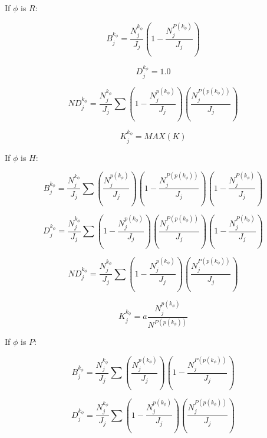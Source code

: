 If $\phi$ is $R$:

\begin{equation}
B^{k_{\phi}}_{j} = \frac{N^{k_{\phi}}_{j}}{J_{j}} (1-\frac{N^{P(k_{\phi})}_{j}}{J_{j}})
\end{equation}

\begin{equation}
D^{k_{\phi}}_{j} = 1.0 
\end{equation}

\begin{equation}
ND^{k_{\phi}}_{j} = \frac{N^{k_{\phi}}_{j}}{J_{j}} \sum (1-\frac{N^{p(k_{\phi})}_{j}}{J_{j}}) (\frac{N^{P(p(k_{\phi}))}_{j}}{J_{j}})
\end{equation}

\begin{equation}
K^{k_{\phi}}_{j} = MAX(K)
\end{equation}

If $\phi$ is $H$: 

\begin{equation}
B^{k_{\phi}}_{j} = \frac{N^{k_{\phi}}_{j}}{J_{j}} \sum (\frac{N^{p(k_{\phi})}_{j}}{J_{j}}) (1-\frac{N^{P(p(k_{\phi}))}_{j}}{J_{j}}) (1-\frac{N^{P(k_{\phi})}_{j}}{J_{j}})
\end{equation}

\begin{equation}
D^{k_{\phi}}_{j} = \frac{N^{k_{\phi}}_{j}}{J_{j}} \sum (1 - \frac{N^{p(k_{\phi})}_{j}}{J_{j}}) (\frac{N^{P(p(k_{\phi}))}_{j}}{J_{j}}) (1-\frac{N^{P(k_{\phi})}_{j}}{J_{j}})
\end{equation}

\begin{equation}
ND^{k_{\phi}}_{j} = \frac{N^{k_{\phi}}_{j}}{J_{j}} \sum (1-\frac{N^{p(k_{\phi})}_{j}}{J_{j}}) (\frac{N^{P(p(k_{\phi}))}_{j}}{J_{j}})
\end{equation}

\begin{equation}
K^{k_{\phi}}_{j} = a \frac{N^{p(k_{\phi})}_{j}}{N^{P(p(k_{\phi}))}}
\end{equation}

If $\phi$ is $P$: 

\begin{equation}
B^{k_{\phi}}_{j} = \frac{N^{k_{\phi}}_{j}}{J_{j}} \sum (\frac{N^{p(k_{\phi})}_{j}}{J_{j}}) (1-\frac{N^{P(p(k_{\phi}))}_{j}}{J_{j}})
\end{equation}

\begin{equation}
D^{k_{\phi}}_{j} = \frac{N^{k_{\phi}}_{j}}{J_{j}} \sum (1 - \frac{N^{p(k_{\phi})}_{j}}{J_{j}}) (\frac{N^{P(p(k_{\phi}))}_{j}}{J_{j}})
\end{equation}

